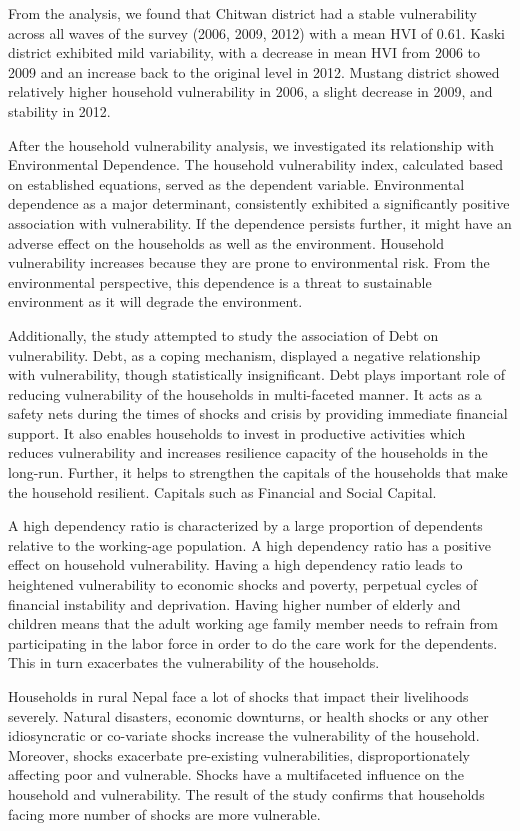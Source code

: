 From the analysis, we found that Chitwan district had a stable vulnerability across all waves of the survey (2006, 2009, 2012) with a mean HVI of 0.61. Kaski district exhibited mild variability, with a decrease in mean HVI from 2006 to 2009 and an increase back to the original level in 2012.
Mustang district showed relatively higher household vulnerability in 2006, a slight decrease in 2009, and stability in 2012. 

After the household vulnerability analysis, we investigated its relationship with Environmental Dependence. The household vulnerability index, calculated based on established equations, served as the dependent variable. Environmental dependence as a major determinant, consistently exhibited a significantly positive association with vulnerability. If the dependence persists further, it might have an adverse effect on the households as well as the environment. Household vulnerability increases because they are prone to environmental risk. From the environmental perspective, this dependence is a threat to sustainable environment as it will degrade the environment.

Additionally, the study attempted to study the association of Debt on vulnerability. Debt, as a coping mechanism, displayed a negative relationship with vulnerability, though statistically insignificant. Debt plays important role of reducing vulnerability of the households in multi-faceted manner. It acts as a safety nets during the times of shocks and crisis by providing immediate financial support. It also enables households to invest in productive activities which reduces vulnerability and increases resilience capacity of the households in the long-run. Further, it helps to strengthen the capitals of the households that make the household resilient. Capitals such as Financial and Social Capital.  

A high dependency ratio is characterized by a large proportion of dependents relative to the working-age population. A high dependency ratio has a positive effect on household vulnerability. Having a high dependency ratio leads to heightened vulnerability to economic shocks and poverty, perpetual cycles of financial instability and deprivation. Having higher number of elderly and children means that the adult working age family member needs to refrain from participating in the labor force in order to do the care work for the dependents. This in turn exacerbates the vulnerability of the households. 

Households in rural Nepal face a lot of shocks that impact their livelihoods severely. Natural disasters, economic downturns, or health shocks or any other idiosyncratic or co-variate shocks increase the vulnerability of the household. Moreover, shocks exacerbate pre-existing vulnerabilities, disproportionately affecting poor and vulnerable. Shocks have a multifaceted influence on the household and vulnerability. The result of the study confirms that households facing more number of shocks are more vulnerable. 

